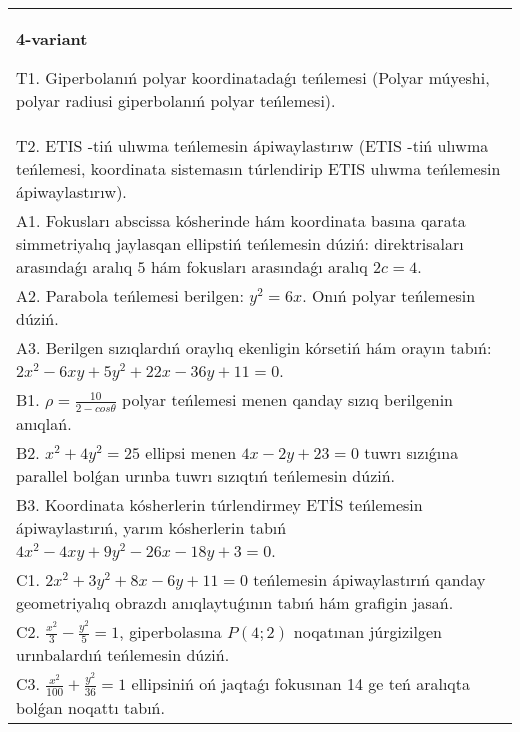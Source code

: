\documentclass{article}
\begin{document}
\begin{tabular}{m{17cm}}
\textbf{4-variant}
\newline

T1. Giperbolanıń polyar koordinatadaǵı teńlemesi (Polyar múyeshi, polyar radiusi giperbolanıń polyar teńlemesi).\\

T2. ETIS -tiń ulıwma teńlemesin ápiwaylastırıw (ETIS -tiń ulıwma teńlemesi, koordinata sistemasın túrlendirip ETIS ulıwma teńlemesin ápiwaylastırıw).\\

A1. Fokusları abscissa kósherinde hám koordinata basına qarata simmetriyalıq jaylasqan ellipstiń teńlemesin dúziń: direktrisaları arasındaǵı aralıq $5$ hám fokusları arasındaǵı aralıq $2 c=4$.\\

A2. Parabola teńlemesi berilgen: $y^2=6 x$. Onıń polyar teńlemesin dúziń.\\

A3. Berilgen sızıqlardıń oraylıq ekenligin kórsetiń hám orayın tabıń: $2 x^{2}-6 xy+5 y^{2}+22 x-36 y+11=0$.\\

B1. $\rho = \frac{10}{2 - cos\theta}$ polyar teńlemesi menen qanday sızıq berilgenin anıqlań.  \\

B2. $x^{2} + 4y^{2} = 25$ ellipsi menen $4x - 2y + 23 = 0$ tuwrı sızıǵına parallel bolǵan urınba tuwrı sızıqtıń teńlemesin dúziń.  \\

B3. Koordinata kósherlerin túrlendirmey ETİS teńlemesin ápiwaylastırıń, yarım kósherlerin tabıń $4x^{2} - 4xy + 9y^{2} - 26x - 18y + 3 = 0$.\\

C1. $2x^{2} + 3y^{2} + 8x - 6y + 11 = 0$ teńlemesin ápiwaylastırıń qanday geometriyalıq obrazdı anıqlaytuǵının tabıń hám grafigin jasań.  \\

C2. $\frac{x^{2}}{3} - \frac{y^{2}}{5} = 1$, giperbolasına $P(4;2)$ noqatınan júrgizilgen urınbalardıń teńlemesin dúziń.  \\

C3. $\frac{x^{2}}{100} + \frac{y^{2}}{36} = 1$ ellipsiniń oń jaqtaǵı fokusınan 14 ge teń aralıqta bolǵan noqattı tabıń.  \\

\end{tabular}
\vspace{1cm}
\end{document}
